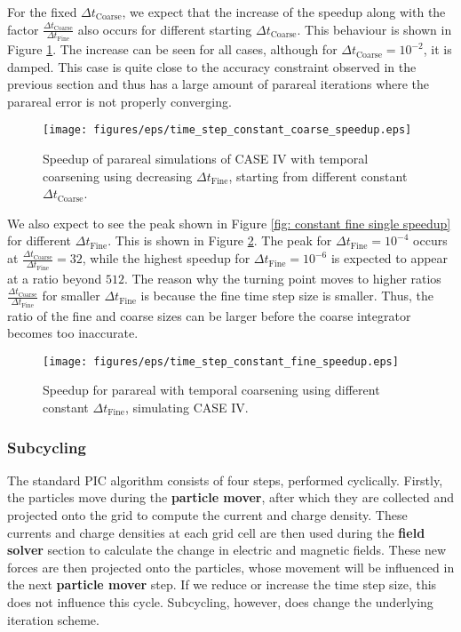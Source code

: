 For the fixed $\Delta t_\mathrm{Coarse}$, we expect that the increase of the speedup along with the factor $\frac{\Delta t_\mathrm{Coarse}}{\Delta t_\mathrm{Fine}}$ also occurs for different starting $\Delta t_\mathrm{Coarse}$. This behaviour is shown in Figure \ref{fig: temporal-coarsening-speedup_coarse_const}. The increase can be seen for all cases, although for $\Delta t_\mathrm{Coarse} = 10^{-2}$, it is damped. This case is quite close to the accuracy constraint observed in the previous section and thus has a large amount of parareal iterations where the parareal error is not properly converging.
 \begin{figure}[h]
    \centering
    \texttt{[image: figures/eps/time\_step\_constant\_coarse\_speedup.eps]}
    \caption{Speedup of parareal simulations of CASE IV with temporal coarsening using decreasing $\Delta t_\mathrm{Fine}$, starting from different constant $\Delta t_\mathrm{Coarse}$.}
    \label{fig: temporal-coarsening-speedup_coarse_const}
\end{figure}
We also expect to see the peak shown in Figure \ref{fig: constant fine single speedup} for different $\Delta t_\mathrm{Fine}$. This is shown in Figure \ref{fig: temporal-coarsening-speedup_fine_const}. The peak for $\Delta t_\mathrm{Fine} =10^{-4}$ occurs at $\frac{\Delta t_\mathrm{Coarse}}{\Delta t_\mathrm{Fine}} = 32$, while the highest speedup for $\Delta t_\mathrm{Fine} = 10^{-6}$ is expected to appear at a ratio beyond $512$. The reason why the turning point moves to higher ratios $\frac{\Delta t_\mathrm{Coarse}}{\Delta t_\mathrm{Fine}}$ for smaller $\Delta t_\mathrm{Fine}$ is because the fine time step size is smaller. Thus, the ratio of the fine and coarse sizes can be larger before the coarse integrator becomes too inaccurate.
 \begin{figure}[h]
    \centering
    \texttt{[image: figures/eps/time\_step\_constant\_fine\_speedup.eps]}
    \caption{Speedup for parareal with temporal coarsening using different constant $\Delta t_\mathrm{Fine}$, simulating CASE IV.}
    \label{fig: temporal-coarsening-speedup_fine_const}
\end{figure}

\subsubsection{Subcycling}
\label{sub: subcycling}

The standard PIC algorithm consists of four steps, performed cyclically. Firstly, the particles move during the \textbf{particle mover}, after which they are collected and projected onto the grid to compute the current and charge density. These currents and charge densities at each grid cell are then used during the \textbf{field solver} section to calculate the change in electric and magnetic fields. These new forces are then projected onto the particles, whose movement will be influenced in the next \textbf{particle mover} step. If we reduce or increase the time step size, this does not influence this cycle. Subcycling, however, does change the underlying iteration scheme.

